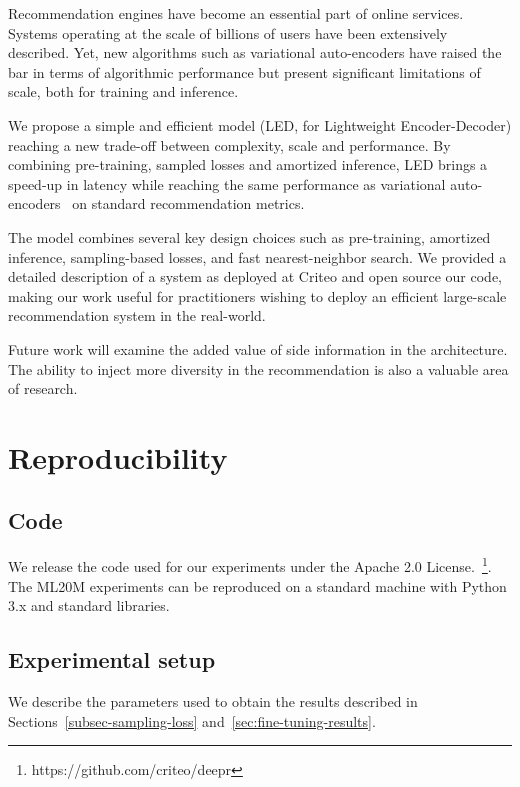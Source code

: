 \documentclass[sigconf]{acmart}
\begin{document}
Recommendation engines have become an essential part of online services. Systems operating at the scale of billions of users have been extensively described. Yet, new algorithms such as variational auto-encoders have raised the bar in terms of algorithmic performance but present significant limitations of scale, both for training and inference.

We propose a simple and efficient model (LED, for Lightweight Encoder-Decoder) reaching a new trade-off between complexity, scale and performance. By combining pre-training, sampled losses and amortized inference, LED brings a  speed-up in latency while reaching the same performance as variational auto-encoders~\cite{variational-liang-2018} on standard recommendation metrics.

The model combines several key design choices such as pre-training, amortized inference, sampling-based losses, and fast nearest-neighbor search. We provided a detailed description of a system as deployed at Criteo and open source our code, making our work useful for practitioners wishing to deploy an efficient large-scale recommendation system in the real-world. 

Future work will examine the added value of side information in the architecture. The ability to inject more diversity in the recommendation is also a valuable area of research.






\newpage
\section{Reproducibility}

\subsection{Code}
We release the code used for our experiments under the Apache 2.0 License.~\footnote{https://github.com/criteo/deepr}. The ML20M experiments can be reproduced on a standard machine with Python 3.x and standard libraries.

\subsection{Experimental setup}
\label{subsec:exp-setup}

We describe the parameters used to obtain the results described in Sections~\ref{subsec-sampling-loss} and~\ref{sec:fine-tuning-results}.
\end{document}
